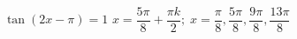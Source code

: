 { $\tan \left( 2x - \pi \right) = 1$}
{ $x = \dfrac{5\pi}{8} + \dfrac{\pi k}{2}; \; x = \dfrac{\pi}{8}, \dfrac{5\pi}{8}, \dfrac{9\pi}{8}, \dfrac{13\pi}{8}$}
